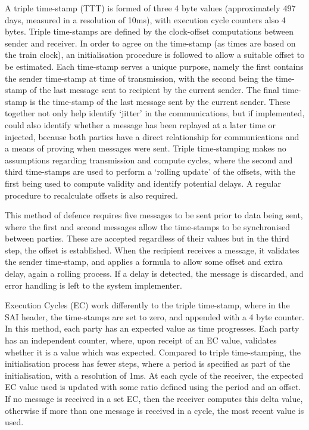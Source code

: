\documentclass[twoside,11pt,a4paper]{article}
\begin{document}
A triple time-stamp (TTT) is formed of three 4 byte values (approximately 497 days, measured in a resolution of 10ms), with execution cycle counters also 4 bytes. Triple time-stamps are defined by the clock-offset computations between sender and receiver. In order to agree on the time-stamp (as times are based on the train clock), an initialisation procedure is followed to allow a suitable offset to be estimated. Each time-stamp serves a unique purpose, namely the first contains the sender time-stamp at time of transmission, with the second being the time-stamp of the last message sent to recipient by the current sender. The final time-stamp is the time-stamp of the last message sent by the current sender. These together not only help identify `jitter' in the communications, but if implemented, could also identify whether a message has been replayed at a later time or injected, because both parties have a direct relationship for communications and a means of proving when messages were sent. Triple time-stamping makes no assumptions regarding transmission and compute cycles, where the second and third time-stamps are used to perform a `rolling update' of the offsets, with the first being used to compute validity and identify potential delays. A regular procedure to recalculate offsets is also required.

This method of defence requires five messages to be sent prior to data being sent, where the first and second messages allow the time-stamps to be synchronised between parties. These are accepted regardless of their values but in the third step, the offset is established.  When the recipient receives a message, it validates the sender time-stamp, and applies a formula to allow some offset and extra delay, again a rolling process. If a delay is detected, the message is discarded, and error handling is left to the system implementer. 

Execution Cycles (EC) work differently to the triple time-stamp, where in the SAI header, the time-stamps are set to zero, and appended with a 4 byte counter. In this method, each party has an expected value as time progresses. Each party has an independent counter, where, upon receipt of an EC value, validates whether it is a value which was expected. Compared to triple time-stamping, the initialisation process has fewer steps, where a period is specified as part of the initialisation, with a resolution of 1ms. At each cycle of the receiver, the expected EC value used is updated with some ratio defined using the period and an offset. If no message is received in a set EC, then the receiver computes this delta value, otherwise if more than one message is received in a cycle, the most recent value is used.
\end{document}

